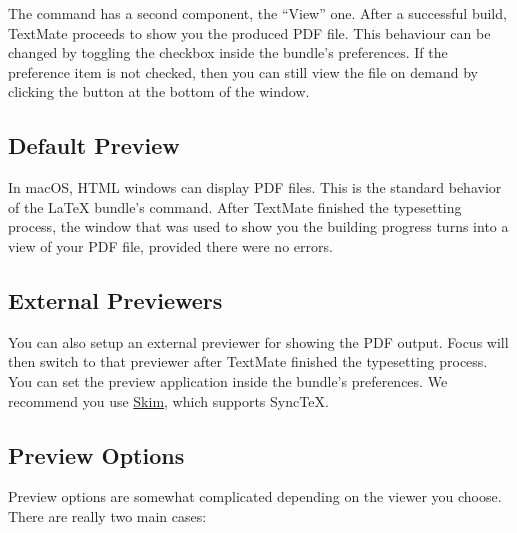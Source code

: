 \documentclass[11pt, x11names]{article}
\begin{document}
The  command has a second component, the “View” one. After a successful build, TextMate proceeds to show you the produced PDF file. This behaviour can be changed by toggling the checkbox  inside the bundle's preferences. If the preference item is not checked, then you can still view the file on demand by clicking the  button at the bottom of the  window.

\subsection{Default Preview}

In macOS, HTML windows can display PDF files. This is the standard behavior of the LaTeX bundle's  command. After TextMate finished the typesetting process, the window that was used to show you the building progress turns into a view of your PDF file, provided there were no errors.

\subsection{External Previewers}

You can also setup an external previewer for showing the PDF output. Focus will then switch to that previewer after TextMate finished the typesetting process. You can set the preview application inside the bundle's preferences. We recommend you use \href{http://skim-app.sourceforge.net}{Skim}, which supports SyncTeX.

\subsection{Preview Options}

Preview options are somewhat complicated depending on the viewer you choose. There are really two main cases:
\end{document}
